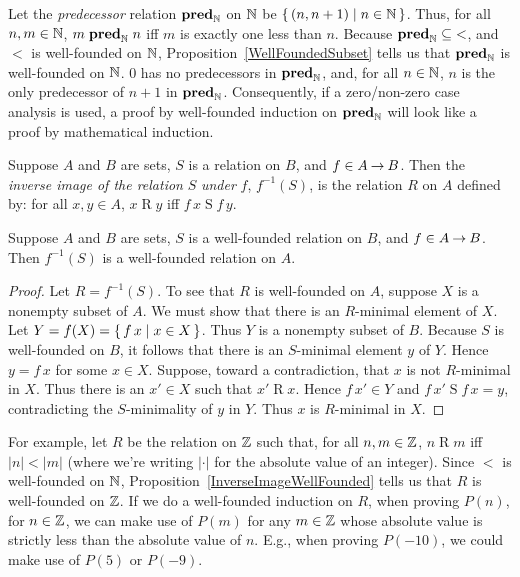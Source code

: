 Let the \emph{predecessor} relation $\mathrel{\mathbf{pred}}_{\mathbb{N}}$ on $\mathbb{N}$ be
$\{ \, (n,n+1) \mid n\in\mathbb{N} \, \}$.
%
%
%
%
%
%
Thus, for all $n,m\in\mathbb{N}$, $m\mathrel{\mathrel{\mathbf{pred}}_{\mathbb{N}}}n$ iff $m$ is
exactly one less than $n$.  Because ${\mathrel{\mathbf{pred}}_{\mathbb{N}}}\subseteq{<}$, and $<$ is
well-founded on $\mathbb{N}$, Proposition~\ref{WellFoundedSubset} tells us
that $\mathrel{\mathbf{pred}}_{\mathbb{N}}$ is well-founded on $\mathbb{N}$.  $0$ has no
predecessors in $\mathrel{\mathbf{pred}}_{\mathbb{N}}$, and, for all $n\in\mathbb{N}$, $n$ is the
only predecessor of $n+1$ in $\mathrel{\mathbf{pred}}_{\mathbb{N}}$. Consequently, if a
zero/non-zero case analysis is used, a proof by well-founded induction on
$\mathrel{\mathbf{pred}}_{\mathbb{N}}$ will look like a proof by mathematical induction.

Suppose $A$ and $B$ are sets, $S$ is a relation on $B$, and $f\in
A\mathbin{\to} B$.  Then the \emph{inverse image of the relation} $S$
\emph{under} $f$, $f^{-1}(S)$, is the relation $R$ on $A$ defined
%
%
%
by: for all $x,y\in A$, $x\mathrel{R}y$ iff $f\,x\mathrel{S}f\,y$.

\begin{proposition}
\label{InverseImageWellFounded}
Suppose $A$ and $B$ are sets, $S$ is a well-founded relation on $B$,
and $f\in A\mathbin{\to} B$.  Then $f^{-1}(S)$ is a well-founded relation on $A$.
\end{proposition}

\begin{proof}
Let $R=f^{-1}(S)$.  To see that $R$ is well-founded on $A$, suppose
$X$ is a nonempty subset of $A$.  We must show that there is an
$R$-minimal element of $X$.  Let $Y=f(X)=\{ \, f\,x \mid x\in X \, \}$.
Thus $Y$ is a nonempty subset of $B$.  Because $S$ is well-founded
on $B$, it follows that there is an $S$-minimal element $y$ of $Y$.
Hence $y=f\,x$ for some $x\in X$.
Suppose, toward a contradiction, that $x$ is not $R$-minimal in $X$.
Thus there is an $x'\in X$ such that $x'\mathrel{R}x$.  Hence $f\,x'\in
Y$ and $f\,x'\mathrel{S}f\,x=y$, contradicting the $S$-minimality of
$y$ in $Y$.  Thus $x$ is $R$-minimal in $X$.
\end{proof}

For example, let $R$ be the relation on $\mathbb{Z}$ such that, for all
$n,m\in\mathbb{Z}$, $n\mathrel{R}m$ iff $|n|<|m|$ (where we're writing
$|\cdot|$ for the absolute value of an integer).  Since $<$ is
well-founded on $\mathbb{N}$, Proposition~\ref{InverseImageWellFounded}
tells us that $R$ is well-founded on $\mathbb{Z}$.  If we do a well-founded
induction on $R$, when proving $P(n)$, for $n\in\mathbb{Z}$, we can make
use of $P(m)$ for any $m\in\mathbb{Z}$ whose absolute value is strictly
less than the absolute value of $n$.  E.g., when proving $P(-10)$, we
could make use of $P(5)$ or $P(-9)$.

